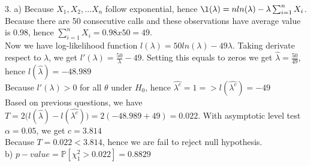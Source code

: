 \documentclass[10pt]{article}
\newenvironment{problem}[2][Problem]{\begin{trivlist}
\item[\hskip \labelsep {\bfseries #1}\hskip \labelsep {\bfseries #2.}]}{\end{trivlist}}
\begin{document}
\begin{problem}{1}
\item 3.
a) Because $X_1, X_2,...X_n$ follow exponential, hence $\l(\lambda)=nln(\lambda)- \lambda \sum_{i=1}^{n}X_i$. Because there are 50 consecutive calls and these observations have average value is 0.98, hence $ \sum_{i=1}^{n}X_i=0.98x50=49$.\\
Now we have log-likelihood function $l(\lambda)=50ln(\lambda)- 49\lambda$. Taking derivate respect to $\lambda$, we get $l'(\lambda)= \frac{50}{\lambda}-49$. Setting this equals to zeros we get $\hat{\lambda}=\frac{50}{49}$, hence $l(\hat{\lambda})=-48.989$\\
Because $l'(\lambda) > 0$ for all $\theta$ under $H_0$, hence $\hat{\lambda^c}=1 => l(\hat{\lambda^c})=-49$\\
Based on previous questions, we have $T=2\Big(l(\hat{\lambda})-l(\hat{\lambda^c})\Big)= 2(-48.989+49)=0.022$. With asymptotic level test $\alpha=0.05$, we get $c=3.814$\\
Because $T=0.022<3.814$, hence we are fail to reject null hypothesis.\\
b) $p-value=\mathbb{P}[\chi_{1}^{2}>0.022]=0.8829$




















\end{problem}
\end{document}
